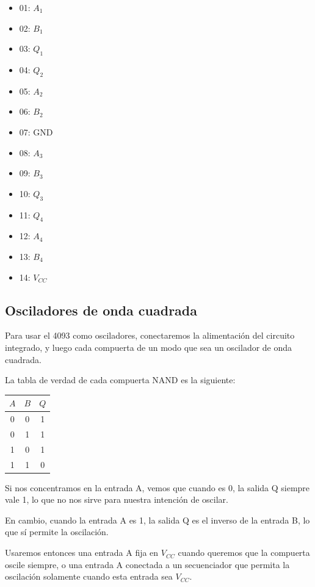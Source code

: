 \documentclass[../principal.tex]{subfiles}
\begin{document}
\begin{itemize}
    \item 01: $A_{1}$
    \item 02: $B_{1}$
    \item 03: $Q_{1}$
    \item 04: $Q_{2}$
    \item 05: $A_{2}$
    \item 06: $B_{2}$
    \item 07: GND
    \item 08: $A_{3}$
    \item 09: $B_{3}$
    \item 10: $Q_{3}$
    \item 11: $Q_{4}$
    \item 12: $A_{4}$
    \item 13: $B_{4}$
    \item 14: $V_{CC}$
\end{itemize}

\subsection{Osciladores de onda cuadrada}

Para usar el 4093 como osciladores, conectaremos la alimentación del circuito integrado, y luego cada compuerta de un modo que sea un oscilador de onda cuadrada.

La tabla de verdad de cada compuerta NAND es la siguiente:

\begin{center}
\begin{tabular}{cc|c}
$A$ & $B$ & $Q$ \\
\hline
0 & 0 & 1 \\
0 & 1 & 1 \\
1 & 0 & 1 \\
1 & 1 & 0 \\
\end{tabular}
\end{center}

Si nos concentramos en la entrada A, vemos que cuando es 0, la salida Q siempre vale 1, lo que no nos sirve para nuestra intención de oscilar.

En cambio, cuando la entrada A es 1, la salida Q es el inverso de la entrada B, lo que sí permite la oscilación. 

Usaremos entonces una entrada A fija en $V_{CC}$ cuando queremos que la compuerta oscile siempre, o una entrada A conectada a un secuenciador que permita la oscilación solamente cuando esta entrada sea $V_{CC}$.
\end{document}
